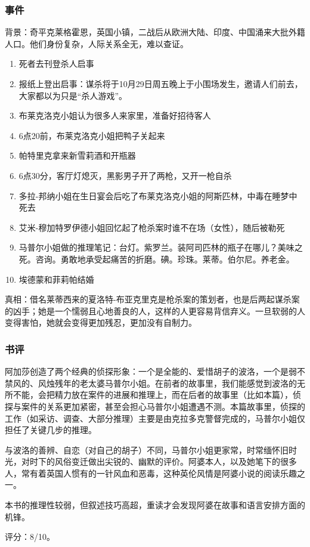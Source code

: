 \begin{longtable}{p{}|p{}|p{}}
\end{longtable}

\subsubsection{事件}
背景：奇平克莱格霍恩，英国小镇，二战后从欧洲大陆、印度、中国涌来大批外籍人口。他们身份复杂，人际关系全无，难以查证。

\begin{enumerate}
    \item 死者去刊登杀人启事
    \item 报纸上登出启事：谋杀将于10月29日周五晚上于小围场发生，邀请人们前去，大家都以为只是“杀人游戏”。
    \item 布莱克洛克小姐认为很多人来家里，准备好招待客人
    \item 6点20前，布莱克洛克小姐把鸭子关起来
    \item 帕特里克拿来新雪莉酒和开瓶器
    \item 6点30分，客厅灯熄灭，黑影男子开了两枪，又开一枪自杀
    \item 多拉-邦纳小姐在生日宴会后吃了布莱克洛克小姐的阿斯匹林，中毒在睡梦中死去
    \item 艾米-穆加特罗伊德小姐回忆起了枪杀案时谁不在场（女性），随后被勒死
    \item 马普尔小姐做的推理笔记：台灯。紫罗兰。装阿司匹林的瓶子在哪儿？美味之死。咨询。勇敢地承受起痛苦的折磨。碘。珍珠。莱蒂。伯尔尼。养老金。
    \item 埃德蒙和菲莉帕结婚
\end{enumerate}

真相：借名莱蒂西来的夏洛特-布亚克里克是枪杀案的策划者，也是后两起谋杀案的凶手；她是一个懦弱且心地善良的人，这样的人更容易背信弃义。一旦软弱的人变得害怕，她就会变得更加残忍，更加没有自制力。

\subsubsection{书评}

阿加莎创造了两个经典的侦探形象：一个是全能的、爱惜胡子的波洛，一个是弱不禁风的、风烛残年的老太婆马普尔小姐。在前者的故事里，我们能感觉到波洛的无所不能，会把精力放在案件的进展和推理上，而在后者的故事里（比如本篇），侦探与案件的关系更加紧密，甚至会担心马普尔小姐遭遇不测。本篇故事里，侦探的工作（如采访、调查、大部分推理）主要是由克拉多克警督完成的，马普尔小姐仅担任了关键几步的推理。

与波洛的善辨、自恋（对自己的胡子）不同，马普尔小姐更家常，时常缅怀旧时光，对时下的风俗变迁做出尖锐的、幽默的评价。阿婆本人，以及她笔下的很多人，常有着英国人惯有的一针风血和恶毒，这种英伦风情是阿婆小说的阅读乐趣之一。

本书的推理性较弱，但叙述技巧高超，重读才会发现阿婆在故事和语言安排方面的机锋。

评分：8/10。